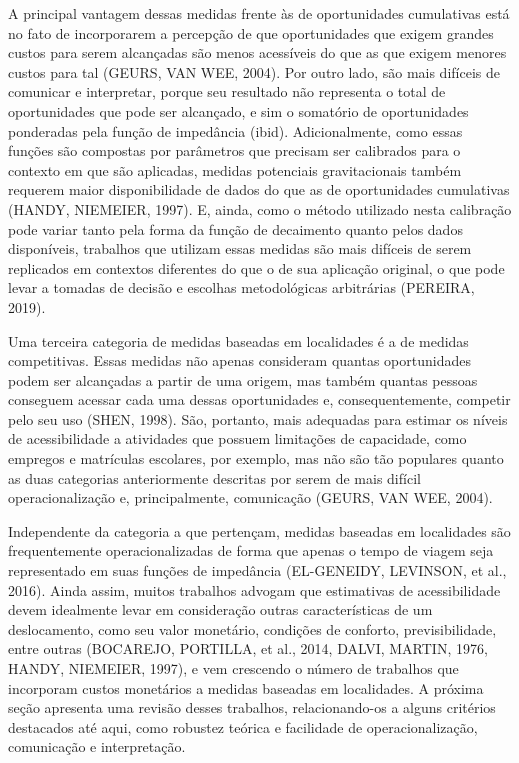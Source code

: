 \documentclass[msc,numbers]{coppe}
\begin{document}
  A principal vantagem dessas medidas frente às de oportunidades cumulativas está no fato de incorporarem a percepção de que oportunidades que exigem grandes custos para serem alcançadas são menos acessíveis do que as que exigem menores custos para tal (GEURS, VAN WEE, 2004). Por outro lado, são mais difíceis de comunicar e interpretar, porque seu resultado não representa o total de oportunidades que pode ser alcançado, e sim o somatório de oportunidades ponderadas pela função de impedância (ibid). Adicionalmente, como essas funções são compostas por parâmetros que precisam ser calibrados para o contexto em que são aplicadas, medidas potenciais gravitacionais também requerem maior disponibilidade de dados do que as de oportunidades cumulativas (HANDY, NIEMEIER, 1997). E, ainda, como o método utilizado nesta calibração pode variar tanto pela forma da função de decaimento quanto pelos dados disponíveis, trabalhos que utilizam essas medidas são mais difíceis de serem replicados em contextos diferentes do que o de sua aplicação original, o que pode levar a tomadas de decisão e escolhas metodológicas arbitrárias (PEREIRA, 2019).

  Uma terceira categoria de medidas baseadas em localidades é a de medidas competitivas. Essas medidas não apenas consideram quantas oportunidades podem ser alcançadas a partir de uma origem, mas também quantas pessoas conseguem acessar cada uma dessas oportunidades e, consequentemente, competir pelo seu uso (SHEN, 1998). São, portanto, mais adequadas para estimar os níveis de acessibilidade a atividades que possuem limitações de capacidade, como empregos e matrículas escolares, por exemplo, mas não são tão populares quanto as duas categorias anteriormente descritas por serem de mais difícil operacionalização e, principalmente, comunicação (GEURS, VAN WEE, 2004).

  Independente da categoria a que pertençam, medidas baseadas em localidades são frequentemente operacionalizadas de forma que apenas o tempo de viagem seja representado em suas funções de impedância (EL-GENEIDY, LEVINSON, et al., 2016). Ainda assim, muitos trabalhos advogam que estimativas de acessibilidade devem idealmente levar em consideração outras características de um deslocamento, como seu valor monetário, condições de conforto, previsibilidade, entre outras (BOCAREJO, PORTILLA, et al., 2014, DALVI, MARTIN, 1976, HANDY, NIEMEIER, 1997), e vem crescendo o número de trabalhos que incorporam custos monetários a medidas baseadas em localidades. A próxima seção apresenta uma revisão desses trabalhos, relacionando-os a alguns critérios destacados até aqui, como robustez teórica e facilidade de operacionalização, comunicação e interpretação.
\end{document}
